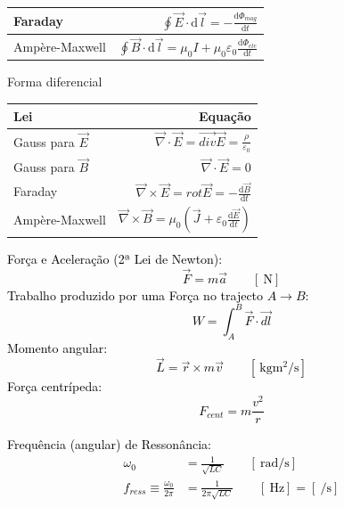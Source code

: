 \documentclass[a4paper,10pt]{extarticle} %
\newcommand{\mybox}[2]{
    \begin{tcolorbox}[colback=lightblue!5!white,colframe=lightblue!75!black,boxsep=1pt,arc=0pt,outer arc=0pt,title={\textcolor{black}{#1}}]
        \textcolor{black}{#2}
    \end{tcolorbox}
}
\begin{document}
\begin{multicols}{2}
{\begin{tabular}{||l|r||}
        \hline Faraday  & \( \oint \vec{E} \cdot  \mathrm{d}\vec{l}  = -\frac{\mathrm{d}\Phi_{mag}}{\mathrm{d} t} \)\\
        \hline Ampère-Maxwell  & \( \oint \vec{B} \cdot  \mathrm{d}\vec{l}  = \mu_0 I +\mu_0 \varepsilon_0\frac{\mathrm{d}\Phi_{ele}}{\mathrm{d} t} \)\\
        \hline
    \end{tabular} 
Forma diferencial
    \begin{tabular}{||l|r||}
        \hline  {\bf Lei} & {\bf Equação }\\
        \hline Gauss para \(\vec{E}\)  & \(\vec{\nabla} \cdot \vec{E}  = \vec{div} \vec{E}  = \frac{\rho}{\varepsilon_0} \)\\
        \hline Gauss para \(\vec{B}\)  & \( \vec{\nabla} \cdot \vec{E}  = 0 \)\\
        \hline Faraday  & \( \vec{\nabla} \times \vec{E} =  rot \vec{E} = -\frac{\mathrm{d}\vec{B}}{\mathrm{d} t} \)\\
        \hline Ampère-Maxwell  & \( \vec{\nabla} \times \vec{B}  = \mu_0 \left( \vec{J}  + \varepsilon_0\frac{\mathrm{d}\vec{E}}{\mathrm{d} t} \right) \)\\
        \hline
    \end{tabular} 
}
\mybox{Dinâmica}{
    Força e Aceleração (2ª Lei de Newton):
    \begin{equation*}
        \vec{F}= m \vec{a} \qquad [\SI{}{\newton}]
    \end{equation*}
    Trabalho produzido por uma Força no trajecto \( A \to B\):
    \begin{equation*}
        W = \int_A^B \vec{F} \cdot  \vec{dl}
    \end{equation*}
    Momento angular:
    \begin{equation*}
        \vec{L} =  \vec{r} \times m \vec{v} \qquad [\SI{}{\kilogram\meter\squared\per\second}]
    \end{equation*}
    Força centrípeda:
    \begin{equation*}
        F_{cent} =  m \frac{v^2}{r} 
    \end{equation*}
}
\mybox{Circuitos RLC em Corrente Alternada (AC)}{
    Frequência (angular) de Ressonância:
    \begin{align}
        \omega_0 &= \frac{1}{\sqrt{LC}}  \qquad [\SI{}{\radian\per\second}] \\
        f_{ress} \equiv \frac{\omega_0}{2 \pi} &= \frac{1}{2 \pi \sqrt{LC}}  \qquad [\SI{}{\hertz}] = [\SI{}{\per\second}] 
    \end{align}
}
\end{multicols}
\end{document}

